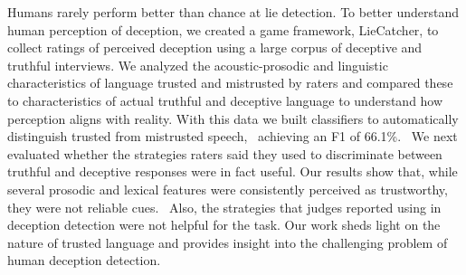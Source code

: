 Humans rarely perform better than chance at lie detection. To better understand human perception of deception, we created a game framework, LieCatcher, to collect ratings of perceived deception using a large corpus of deceptive and truthful interviews. We analyzed the acoustic-prosodic and linguistic characteristics of language trusted and mistrusted by raters and compared these to characteristics of actual truthful and deceptive language to understand how perception aligns with reality. With this data we built classifiers to automatically distinguish trusted from mistrusted speech,  achieving an F1 of 66.1\%.  We next evaluated whether the strategies raters said they used to discriminate between truthful and deceptive responses were in fact useful. Our results show that, while several prosodic and lexical features were consistently perceived as trustworthy, they were not reliable cues.  Also, the strategies that judges reported using in deception detection were not helpful for the task. Our work sheds light on the nature of trusted language and provides insight into the challenging problem of human deception detection.